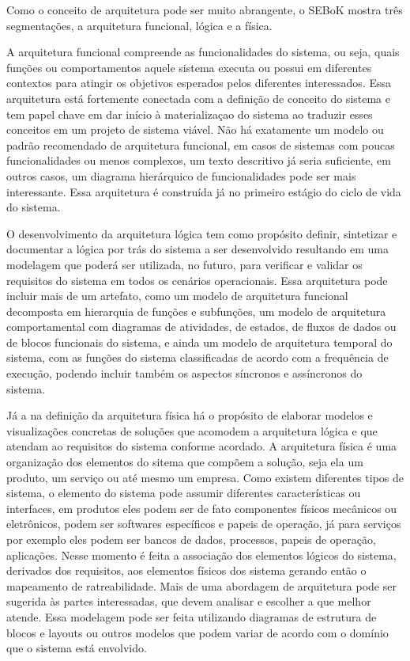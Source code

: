 	Como o conceito de arquitetura pode ser muito abrangente, o SEBoK \cite{sebok2024} mostra três segmentações, a arquitetura funcional, lógica e a física.

	A arquitetura funcional compreende as funcionalidades do sistema, ou seja, quais funções ou comportamentos 
	aquele sistema executa ou possui em diferentes contextos para atingir os objetivos esperados pelos diferentes interessados.
	Essa arquitetura está fortemente conectada com a definição de conceito do sistema e tem papel chave em dar início à materializaçao do sistema
	ao traduzir esses conceitos em um projeto de sistema viável. Não há exatamente um modelo ou padrão recomendado de
	arquitetura funcional, em casos de sistemas com poucas funcionalidades ou menos complexos, um texto descritivo já seria 
	suficiente, em outros casos, um diagrama hierárquico de funcionalidades pode ser mais interessante. Essa arquitetura é 
	construída já no primeiro estágio do ciclo de vida do sistema.

	O desenvolvimento da arquitetura lógica tem como propósito definir, sintetizar e documentar a lógica por trás do sistema a ser desenvolvido
	resultando em uma modelagem que poderá ser utilizada, no futuro, para verificar e validar os requisitos do sistema em todos os cenários operacionais.
	Essa arquitetura pode incluir mais de um artefato, como um modelo de arquitetura funcional decomposta em hierarquia de funções e subfunções, um modelo de arquitetura comportamental com diagramas
	de atividades, de estados, de fluxos de dados ou de blocos funcionais do sistema, e ainda um modelo de arquitetura temporal do sistema, com as funções do sistema 
	classificadas de acordo com a frequência de execução, podendo incluir também os aspectos síncronos e assíncronos do sistema.

	Já a na definição da arquitetura física há o propósito de elaborar modelos e visualizações concretas de soluções que acomodem a arquitetura
	lógica e que atendam ao requisitos do sistema conforme acordado. A arquitetura física é uma organização dos elementos do sitema
	que compõem a solução, seja ela um produto, um serviço ou até mesmo um empresa. Como existem diferentes tipos de sistema, o elemento do sistema pode
	assumir diferentes características ou interfaces, em produtos eles podem ser de fato componentes físicos mecânicos ou eletrônicos, podem ser softwares
	específicos e papeis de operação, já para serviços por exemplo eles podem ser bancos de dados, processos, papeis de operação, aplicações.
	Nesse momento é feita a associação dos elementos lógicos do sistema, derivados dos requisitos, aos elementos físicos dos sistema gerando então o mapeamento de ratreabilidade.
	Mais de uma abordagem de arquitetura pode ser sugerida às partes interessadas, que devem analisar e escolher a que melhor atende. Essa modelagem pode ser feita utilizando
	diagramas de estrutura de blocos e layouts ou outros modelos que podem variar de acordo com o domínio que o sistema está envolvido.

